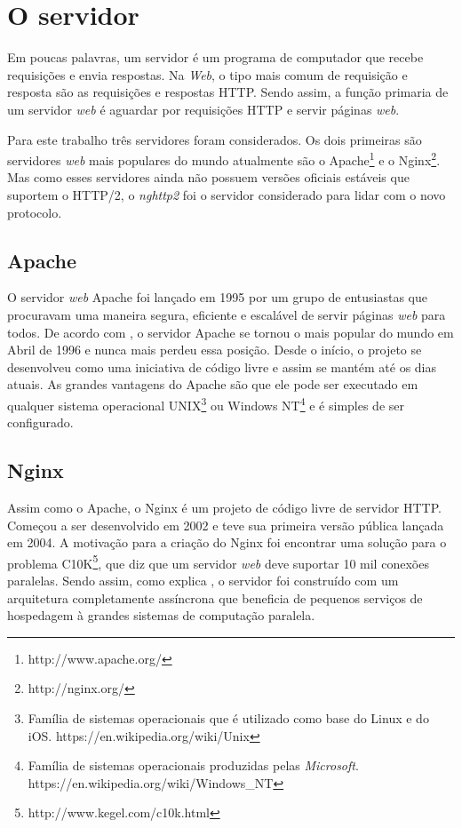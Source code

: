 \section{O servidor}
\label{oservidor}

Em poucas palavras, um servidor é um programa de computador que recebe requisições e envia respostas. Na \textit{Web}, o tipo mais comum de requisição e resposta são as requisições e respostas HTTP. Sendo assim, a função primaria de um servidor \textit{web} é aguardar por requisições HTTP e servir páginas \textit{web}.

Para este trabalho três servidores foram considerados. Os dois primeiras são servidores \textit{web} mais populares do mundo atualmente são o Apache\footnote{http://www.apache.org/} e o Nginx\footnote{http://nginx.org/}. Mas como esses servidores ainda não possuem versões oficiais estáveis que suportem o HTTP/2, o \textit{nghttp2} foi o servidor considerado para lidar com o novo protocolo.

\subsection{Apache}
\label{apache}

O servidor \textit{web} Apache foi lançado em 1995 por um grupo de entusiastas que procuravam uma maneira segura, eficiente e escalável de servir páginas \textit{web} para todos.  De acordo com , o servidor Apache se tornou o mais popular do mundo em Abril de 1996 e nunca mais perdeu essa posição. Desde o início, o projeto se desenvolveu como uma iniciativa de código livre e assim se mantém até os dias atuais. As grandes vantagens do Apache são que ele pode ser executado em qualquer sistema operacional UNIX\footnote{Família de sistemas operacionais que é utilizado como base do Linux e do iOS. https://en.wikipedia.org/wiki/Unix} ou Windows NT\footnote{Família de sistemas operacionais produzidas pelas \textit{Microsoft}. https://en.wikipedia.org/wiki/Windows\_NT} e é simples de ser configurado.

\subsection{Nginx}
\label{nginx}

Assim como o Apache, o Nginx é um projeto de código livre de servidor HTTP. Começou a ser desenvolvido em 2002 e teve sua primeira versão pública lançada em 2004. A motivação para a criação do Nginx foi encontrar uma solução para o problema C10K\footnote{http://www.kegel.com/c10k.html}, que diz que um servidor \textit{web} deve suportar 10 mil conexões paralelas. Sendo assim, como explica , o servidor foi construído com um arquitetura completamente assíncrona que beneficia de pequenos serviços de hospedagem à grandes sistemas de computação paralela.

